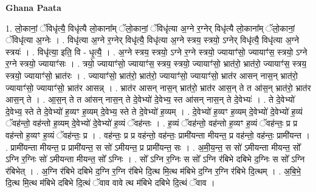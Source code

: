 \documentclass[17pt]{extarticle}
\begin{document}
\textbf{Ghana Paata } \newline

1. लो॒कानां॒ ॅविधृ॑त्यै॒ विधृ॑त्यै लो॒काना᳚म् ॅलो॒कानां॒ ॅविधृ॑त्या अ॒ग्ने र॒ग्नेर् विधृ॑त्यै लो॒काना᳚म् ॅलो॒कानां॒ ॅविधृ॑त्या अ॒ग्नेः । . विधृ॑त्या अ॒ग्ने र॒ग्नेर् विधृ॑त्यै॒ विधृ॑त्या अ॒ग्ने स्त्रय॒ स्त्रयो॒ ऽग्नेर् विधृ॑त्यै॒ विधृ॑त्या अ॒ग्ने स्त्रयः॑ । . विधृ॑त्या॒ इति॒ वि - धृ॒त्यै॒ । . अ॒ग्ने स्त्रय॒ स्त्रयो॒ ऽग्ने र॒ग्ने स्त्रयो॒ ज्यायाꣳ॑सो॒ ज्यायाꣳ॑स॒ स्त्रयो॒ ऽग्ने र॒ग्ने स्त्रयो॒ ज्यायाꣳ॑सः । . त्रयो॒ ज्यायाꣳ॑सो॒ ज्यायाꣳ॑स॒ स्त्रय॒ स्त्रयो॒ ज्यायाꣳ॑सो॒ भ्रात॑रो॒ भ्रात॑रो॒ ज्यायाꣳ॑स॒ स्त्रय॒ स्त्रयो॒ ज्यायाꣳ॑सो॒ भ्रात॑रः । . ज्यायाꣳ॑सो॒ भ्रात॑रो॒ भ्रात॑रो॒ ज्यायाꣳ॑सो॒ ज्यायाꣳ॑सो॒ भ्रात॑र आसन् नास॒न् भ्रात॑रो॒ ज्यायाꣳ॑सो॒ ज्यायाꣳ॑सो॒ भ्रात॑र आसन्न् । . भ्रात॑र आसन् नास॒न् भ्रात॑रो॒ भ्रात॑र आस॒न् ते त आ॑स॒न् भ्रात॑रो॒ भ्रात॑र आस॒न् ते । . आ॒स॒न् ते त आ॑सन् नास॒न् ते दे॒वेभ्यो॑ दे॒वेभ्य॒ स्त आ॑सन् नास॒न् ते दे॒वेभ्यः॑ । . ते दे॒वेभ्यो॑ दे॒वेभ्य॒ स्ते ते दे॒वेभ्यो॑ ह॒व्यꣳ ह॒व्यम् दे॒वेभ्य॒ स्ते ते दे॒वेभ्यो॑ ह॒व्यम् । . दे॒वेभ्यो॑ ह॒व्यꣳ ह॒व्यम् दे॒वेभ्यो॑ दे॒वेभ्यो॑ ह॒व्यं ॅवह॑न्तो॒ वह॑न्तो ह॒व्यम् दे॒वेभ्यो॑ दे॒वेभ्यो॑ ह॒व्यं ॅवह॑न्तः । . ह॒व्यं ॅवह॑न्तो॒ वह॑न्तो ह॒व्यꣳ ह॒व्यं ॅवह॑न्तः॒ प्र प्र वह॑न्तो ह॒व्यꣳ ह॒व्यं ॅवह॑न्तः॒ प्र । . वह॑न्तः॒ प्र प्र वह॑न्तो॒ वह॑न्तः॒ प्रामी॑यन्ता मीयन्त॒ प्र वह॑न्तो॒ वह॑न्तः॒ प्रामी॑यन्त । . प्रामी॑यन्ता मीयन्त॒ प्र प्रामी॑यन्त॒ स सो॑ ऽमीयन्त॒ प्र प्रामी॑यन्त॒ सः । . अ॒मी॒य॒न्त॒ स सो॑ ऽमीयन्ता मीयन्त॒ सो᳚ ऽग्नि र॒ग्निः सो॑ ऽमीयन्ता मीयन्त॒ सो᳚ ऽग्निः । . सो᳚ ऽग्नि र॒ग्निः स सो᳚ ऽग्नि र॑बिभे दबिभे द॒ग्निः स सो᳚ ऽग्नि र॑बिभेत् । . अ॒ग्नि र॑बिभे दबिभे द॒ग्नि र॒ग्नि र॑बिभे दि॒त्थ मि॒त्थ म॑बिभे द॒ग्नि र॒ग्नि र॑बिभे दि॒त्थम् । . अ॒बि॒भे॒ दि॒त्थ मि॒त्थ म॑बिभे दबिभे दि॒त्थं ॅवाव वावे त्थ म॑बिभे दबिभे दि॒त्थं ॅवाव । \newline
\end{document}
